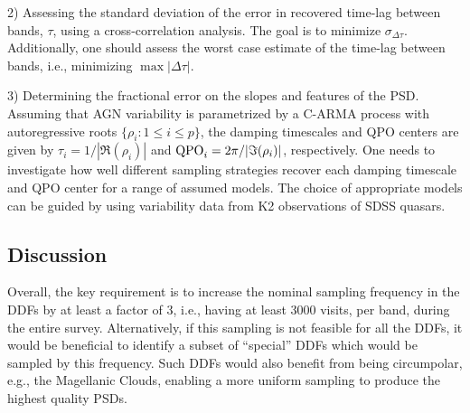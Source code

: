 2) Assessing the standard deviation of the error in recovered time-lag between
bands, $\tau$, using a cross-correlation analysis. The goal is to minimize
$\sigma_{\Delta \tau}$. Additionally, one should assess the worst case estimate of
the time-lag between bands, i.e., minimizing $\max \vert \Delta \tau \vert$.

3) Determining the fractional error on the slopes and features of the PSD.
Assuming that AGN variability is parametrized by a C-ARMA process with
autoregressive roots $\{\rho_{i}:1 \leq i \leq p\}$, the damping timescales and
QPO centers are given by $\tau_{i} = 1/|\Re(\rho_{i})|$ and ${\rm QPO}_{i} =
2\pi/|\Im(\rho_{i})|$, respectively. One needs to investigate how well different
sampling strategies recover each damping timescale and QPO center for a range of
assumed models. The choice of appropriate models can be guided by using
variability data from K2 observations of SDSS quasars.

%
%
%
%

\subsection{Discussion}
\label{sec:\secname:discussion}


Overall, the key requirement is to increase the nominal sampling
frequency in the DDFs by at least a factor of 3, i.e., having at least
3000 visits, per band, during the entire survey. Alternatively, if this
sampling is not feasible for all the DDFs, it would be beneficial to
identify a subset of ``special'' DDFs which would be sampled by this
frequency. Such DDFs would also benefit from being circumpolar, e.g.,
the Magellanic Clouds, enabling a more uniform sampling to produce the
highest quality PSDs.

